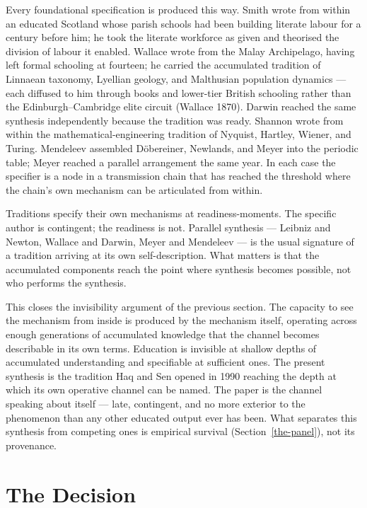 \documentclass[12pt,letterpaper]{article}
\begin{document}
Every foundational specification is produced this way. Smith wrote from
within an educated Scotland whose parish schools had been building
literate labour for a century before him; he took the literate workforce
as given and theorised the division of labour it enabled. Wallace
wrote from the Malay Archipelago, having left formal schooling at
fourteen; he carried the accumulated tradition of Linnaean taxonomy,
Lyellian geology, and Malthusian population dynamics --- each diffused
to him through books and lower-tier British schooling rather than the
Edinburgh--Cambridge elite circuit (Wallace 1870). Darwin reached the
same synthesis independently because the tradition was ready. Shannon
wrote
from within the mathematical-engineering tradition of Nyquist, Hartley,
Wiener, and Turing. Mendeleev assembled Döbereiner, Newlands, and Meyer
into the periodic table; Meyer reached a parallel arrangement the same
year. In each case the specifier is a node in a transmission chain that
has reached the threshold where the chain's own mechanism can be
articulated from within.

Traditions specify their own mechanisms at readiness-moments. The
specific author is contingent; the readiness is not. Parallel synthesis
--- Leibniz and Newton, Wallace and Darwin, Meyer and Mendeleev --- is
the usual signature of a tradition arriving at its own self-description.
What matters is that the accumulated components reach the point where
synthesis becomes possible, not who performs the synthesis.

This closes the invisibility argument of the previous section. The
capacity to see the mechanism from inside is produced by the mechanism
itself, operating across enough generations of accumulated knowledge
that the channel becomes describable in its own terms. Education is
invisible at shallow depths of accumulated understanding and specifiable
at sufficient ones. The present synthesis is the tradition Haq and Sen
opened in 1990 reaching the depth at which its own operative channel
can be named. The paper is the channel speaking about itself --- late,
contingent, and no more exterior to the phenomenon than any other
educated output ever has been. What separates this synthesis from competing ones is empirical survival (Section~\ref{the-panel}), not its provenance.

\section{The Decision}\label{the-decision}
\end{document}

